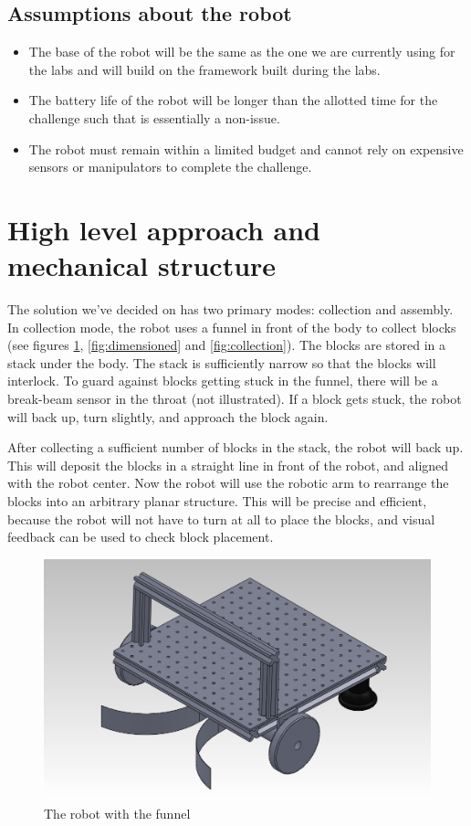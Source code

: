 \documentclass[letterpaper,11pt]{article}
\begin{document}
\subsection{Assumptions about the robot}
\begin{itemize}
 \item The base of the robot will be the same as the one we are currently using for the labs and will build on the framework built during the labs.  
 \item The battery life of the robot will be longer than the allotted time for the challenge such that is essentially a non-issue.
 \item The robot must remain within a limited budget and cannot rely on expensive sensors or manipulators to complete the challenge.
\end{itemize}

\section{High level approach and mechanical structure}
The solution we've decided on has two primary modes: collection and assembly.
In collection mode, the robot uses a funnel in front of the body to collect blocks
(see figures \ref{fig:robotFunnel}, \ref{fig:dimensioned} and \ref{fig:collection}).
The blocks are stored in a stack under the body.
The stack is sufficiently narrow so that the blocks will interlock.
To guard against blocks getting stuck in the funnel,
there will be a break-beam sensor in the throat (not illustrated).
If a block gets stuck, the robot will back up, turn slightly, and approach the block again.

After collecting a sufficient number of blocks in the stack, the robot will back up.
This will deposit the blocks in a straight line in front of the robot, and aligned with the robot center.
Now the robot will use the robotic arm to rearrange the blocks into an arbitrary planar structure.
This will be precise and efficient, because the robot will not have to turn at all to place the blocks,
and visual feedback can be used to check block placement.
\begin{figure}[h]
 \centering
  \includegraphics[width=4.5in]{images/AssemblyIso}
\caption{The robot with the funnel}
\label{fig:robotFunnel}
\end{figure}
\end{document}
